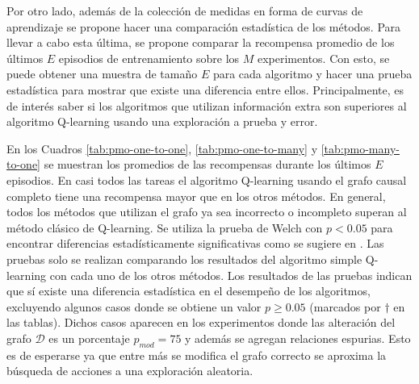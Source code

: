 Por otro lado, además de la colección de medidas en forma de curvas de aprendizaje se propone hacer una comparación estadística de
los métodos. Para llevar a cabo esta última, se propone
comparar la recompensa promedio de los últimos $E$ episodios
de entrenamiento sobre los $M$ experimentos. Con esto, se 
puede obtener una muestra de tamaño $E$ para cada algoritmo
y hacer una prueba estadística para mostrar que existe una diferencia entre ellos. Principalmente, es de interés saber si los algoritmos que utilizan información extra son superiores 
al algoritmo Q-learning usando una exploración a prueba y error. 

En los Cuadros \ref{tab:pmo-one-to-one}, \ref{tab:pmo-one-to-many} y \ref{tab:pmo-many-to-one} se muestran
los promedios de las recompensas durante los últimos $E$ episodios. En casi todos las tareas el algoritmo Q-learning usando el grafo causal completo tiene una recompensa mayor que en los otros métodos. En general, todos los métodos que utilizan el grafo ya sea incorrecto o incompleto superan al método clásico de Q-learning. Se utiliza la prueba de Welch con $p < 0.05$ para encontrar diferencias estadísticamente significativas como se sugiere en \cite{colas2019hitchhikers}. Las pruebas solo se realizan comparando los resultados del algoritmo simple Q-learning con cada uno de los otros métodos. Los resultados de las pruebas indican que sí existe una diferencia estadística en el desempeño de los algoritmos, excluyendo algunos casos donde se obtiene un valor $p\geq 0.05$ (marcados por $\dagger$ en las tablas). Dichos casos aparecen en los experimentos donde las alteración del grafo $\mathcal{D}$ es un porcentaje $p_{mod} = 75$ y además se agregan relaciones espurias. Esto es de esperarse ya que entre más se modifica el grafo correcto se aproxima la búsqueda de acciones a una exploración aleatoria.
\newpage

